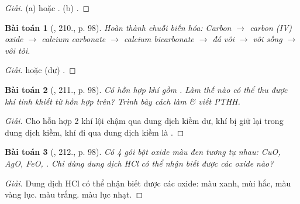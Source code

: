 \documentclass{article}
\newtheorem{baitoan}{Bài toán}
\begin{document}
\begin{proof}[Giải]
	(a)  hoặc . (b) .
\end{proof}

\begin{baitoan}[\cite{Nguyen_Buu_Can_500_BT_Hoa_Hoc_THCS}, 210., p. 98]
	Hoàn thành chuỗi biến hóa: Carbon $\to$ carbon ({\rm IV}) oxide $\to$ calcium carbonate $\to$ calcium bicarbonate $\to$ đá vôi $\to$ vôi sống $\to$ vôi tôi.
\end{baitoan}

\begin{proof}[Giải]
	 hoặc  (dư) .
\end{proof}

\begin{baitoan}[\cite{Nguyen_Buu_Can_500_BT_Hoa_Hoc_THCS}, 211., p. 98]
	Có hỗn hợp khí gồm {\rm{}}. Làm thế nào có thể thu được khí {\rm{}} tinh khiết từ hỗn hợp trên? Trình bày cách làm \& viết {\rm PTHH}.
\end{baitoan}

\begin{proof}[Giải]
	Cho hỗn hợp 2 khí  lội chậm qua dung dịch kiềm dư, khí  bị giữ lại trong dung dịch kiềm, khí đi qua dung dịch kiềm là .
\end{proof}

\begin{baitoan}[\cite{Nguyen_Buu_Can_500_BT_Hoa_Hoc_THCS}, 212., p. 98]
	Có 4 gói bột oxide màu đen tương tự nhau: {\rm CuO, AgO, FeO, }. Chỉ dùng dung dịch {\rm HCl} có thể nhận biết được các oxide nào?
\end{baitoan}

\begin{proof}[Giải]
	Dung dịch HCl có thể nhận biết được các oxide:  màu xanh,  mùi hắc, màu vàng lục.  màu trắng.  màu lục nhạt.
\end{proof}
\end{document}
